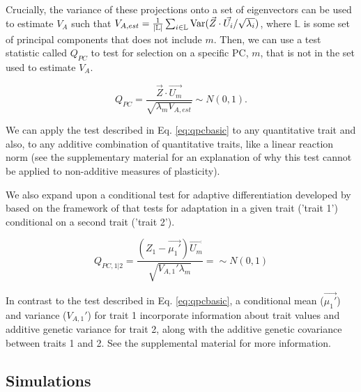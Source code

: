 \documentclass[11pt,letterpaper]{article}
\newcommand{\emjo}[1]{\todo[size=\scriptsize, color=purple!50]{#1}}
\newcommand{\dothis}[1]{\textcolor{purple}{\textbf{#1}}}
\begin{document}
Crucially, the variance of these projections onto a set of eigenvectors can be used to estimate $V_{A}$ such that $V_{A, est} = \frac{1}{\lvert \mathbb{L} \rvert} \sum_{i\in \mathbb{L}}\textnormal{Var}(\vec{Z}\cdot \vec{U_{i}}/\sqrt{\lambda_{i}})$, where $\mathbb{L}$ is some set of principal components that does not include $m$.
Then, we can use a test statistic called $Q_{PC}$ to test for selection on a specific PC, $m$, that is not in the set used to estimate $V_{A}$. 

\begin{equation}\label{eq:qpcbasic}
Q_{PC} = \frac{\vec{Z}\cdot\vec{U_{m}}}{\sqrt{\lambda_{m}V_{A,est}}}\sim N(0,1).
  \end{equation}

We can apply the test described in Eq. \ref{eq:qpcbasic} to any quantitative trait and also, to any additive combination of quantitative traits, like a linear reaction norm (see the supplementary material for an explanation of why this test cannot be applied to non-additive measures of plasticity).

We also expand upon a conditional test for adaptive differentiation developed by \cite{Berg2017} based on the framework of \cite{lande1979quantitative} that tests for adaptation in a given trait ('trait 1') conditional on a second trait ('trait 2').

\begin{equation}
Q_{PC, 1|2} = \frac{(Z_{1} - \vec{\mu_{1}'})\vec{U_{m}}}{\sqrt{V_{A,1}'\lambda_{m}}} = \sim N(0,1)
  \end{equation}

In contrast to the test described in Eq. \ref{eq:qpcbasic}, a conditional mean ($\vec{\mu_{1}'}$) and variance ($V_{A,1}'$) for trait 1 incorporate information about trait values and additive genetic variance for trait 2, along with the additive genetic covariance between traits 1 and 2.
See the supplemental material for more information.

\subsection*{Simulations}
\end{document}
